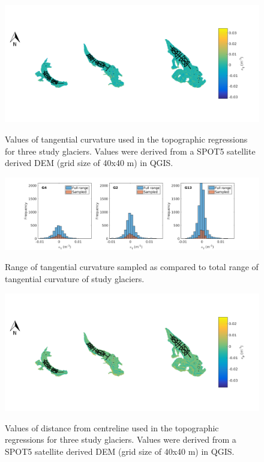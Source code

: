 \documentclass[12pt]{article}
\begin{document}
\begin{landscape}
\begin{figure}
	\centering
	\includegraphics[height = 0.4\textwidth]{Map_tangentCurve.png}\\
	\caption{Values of tangential curvature used in the topographic regressions for three study glaciers. Values were derived from a SPOT5 satellite derived DEM (grid size of 40x40 m) in QGIS.}
	\label{map:tangentC}
\end{figure}

\begin{figure}
	\centering
	\includegraphics[height = 0.4\textwidth]{SampledRangeTopo_tangentCurve.png}\\
	\caption{Range of tangential curvature sampled as compared to total range of tangential curvature of study glaciers.}
	\label{sampledRange:tangentC}
\end{figure}

\begin{figure}
	\centering
	\includegraphics[height = 0.36\textwidth]{Map_profileCurve.png}\\
	\caption{Values of distance from centreline used in the topographic regressions for three study glaciers. Values were derived from a SPOT5 satellite derived DEM (grid size of 40x40 m) in QGIS.}
	\label{map:profileC}
\end{figure}


\end{landscape}
\end{document}
